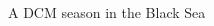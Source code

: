\documentclass[final]{beamer}
\begin{document}
\begin{frame}[fragile]
\begin{columns}[T]
\begin{column}{.64\textwidth}
\begin{block}{ A DCM season in the Black Sea }
\begin{columns}[T]
\begin{column}{.42\textwidth}
	    \end{column}
	  \end{columns}
	  \vskip -5mm
	\end{block}
	

	
      \end{column}
    \end{columns}
    
    
    
\end{frame}
\end{document}
